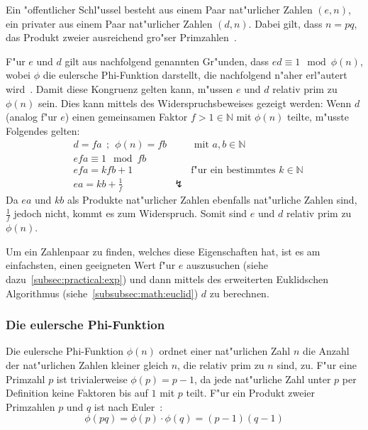 \documentclass[12pt]{article}
\begin{document}
Ein "offentlicher Schl"ussel besteht aus einem Paar nat"urlicher Zahlen $(e, n)$,
ein privater aus einem Paar nat"urlicher Zahlen $(d, n)$.
Dabei gilt, dass $n = pq$, das Produkt zweier ausreichend gro"ser Primzahlen~\cite{rsa}.

F"ur $e$ und $d$ gilt aus nachfolgend genannten Gr"unden, dass $ed \equiv 1 \mod \phi(n)$,
wobei $\phi$ die eulersche Phi-Funktion darstellt, die nachfolgend n"aher erl"autert wird~\cite{rsa}.
Damit diese Kongruenz gelten kann, m"ussen $e$ und $d$ relativ prim zu $\phi(n)$ sein.
Dies kann mittels des Widerspruchsbeweises gezeigt werden:
Wenn $d$ (analog f"ur $e$) einen gemeinsamen Faktor $f > 1 \in \mathbb{N}$ mit $\phi(n)$ teilte, m"usste Folgendes gelten:
\begin{equation}
\label{eq:ed_prime_phi_n}
\begin{aligned}
&d = fa ~~;~~ \phi(n) = fb && \textrm{ mit } a, b \in \mathbb{N} \\
&efa \equiv 1 \mod fb \\
&efa = kfb + 1 && \textrm{f"ur ein bestimmtes } k \in \mathbb{N} \\
&ea = kb + \frac{1}{f} & \lightning &
\end{aligned}
\end{equation}
Da $ea$ und $kb$ als Produkte nat"urlicher Zahlen ebenfalls nat"urliche Zahlen sind, $\frac{1}{f}$ jedoch nicht, kommt es zum Widerspruch.
Somit sind $e$ und $d$ relativ prim zu $\phi(n)$.

Um ein Zahlenpaar zu finden, welches diese Eigenschaften hat,
ist es am einfachsten, einen geeigneten Wert f"ur $e$ auszusuchen (siehe dazu~\ref{subsec:practical:exp})
und dann mittels des erweiterten Euklidschen Algorithmus (siehe~\ref{subsubsec:math:euclid}) $d$ zu berechnen.

\subsubsection{Die eulersche Phi-Funktion}
Die eulersche Phi-Funktion $\phi(n)$ ordnet einer nat"urlichen Zahl $n$ die Anzahl
der nat"urlichen Zahlen kleiner gleich $n$, die relativ prim zu $n$ sind, zu.
F"ur eine Primzahl $p$ ist trivialerweise $\phi(p) = p-1$,
da jede nat"urliche Zahl unter $p$ per Definition keine Faktoren bis auf $1$ mit $p$ teilt.
F"ur ein Produkt zweier Primzahlen $p$ und $q$ ist nach Euler~\cite{euler63}:
\begin{equation}\label{eq:phi_calc}\phi(pq) = \phi(p) \cdot \phi(q) = (p-1)(q-1)\end{equation}
\end{document}
